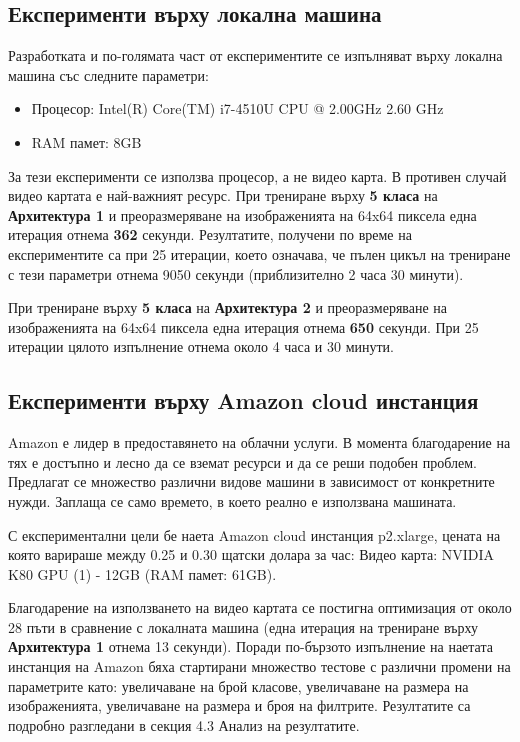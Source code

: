 \subsection{Експерименти върху локална машина}

Разработката и по-голямата част от експериментите се изпълняват върху локална машина със следните параметри:

\begin{itemize}
\item Процесор: Intel(R) Core(TM) i7-4510U CPU @ 2.00GHz 2.60 GHz
\item RAM памет: 8GB
\end{itemize}

За тези експерименти се използва процесор, а не видео карта. В противен случай видео картата е най-важният ресурс. При трениране върху \textbf{5 класа} на \textbf{Архитектура 1} и преоразмеряване на изображенията на 64x64 пиксела една итерация отнема \textbf{362} секунди. Резултатите, получени по време на експериментите са при 25 итерации, което означава, че пълен цикъл на трениране с тези параметри отнема 9050 секунди (приблизително 2 часа 30 минути). 

При трениране върху \textbf{5 класа} на \textbf{Архитектура 2} и преоразмеряване на изображенията на 64x64 пиксела една итерация отнема \textbf{650} секунди. При 25 итерации цялото изпълнение отнема около 4 часа и 30 минути.

\subsection{Експерименти върху Amazon cloud инстанция}

Amazon е лидер в предоставянето на облачни услуги. В момента благодарение на тях е достъпно и лесно да се вземат ресурси и да се реши подобен проблем. Предлагат се множество различни видове машини в зависимост от конкретните нужди. Заплаща се само времето, в което реално е използвана машината.

С експериментални цели бе наета Amazon cloud инстанция p2.xlarge, цената на която варираше между 0.25 и 0.30 щатски долара за час: Видео карта: NVIDIA K80 GPU (1) - 12GB (RAM памет: 61GB).

Благодарение на използването на видео картата се постигна оптимизация от около 28 пъти в сравнение с локалната машина (една итерация на трениране върху \textbf{Архитектура 1} отнема 13 секунди). Поради  по-бързото изпълнение на наетата инстанция на Amazon бяха стартирани множество тестове с различни промени на параметрите като: увеличаване на брой класове, увеличаване на размера на изображенията, увеличаване на размера и броя на филтрите. Резултатите са подробно разгледани в секция 4.3 Анализ на резултатите.

